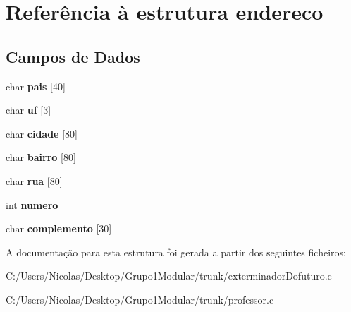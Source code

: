 \section{Referência à estrutura endereco}
\label{structendereco}
\subsection*{Campos de Dados}
\begin{DoxyCompactItemize}
\item 
\mbox{\label{structendereco_ae40bbd4eca215a884d4ffc4009723d24}} 
char {\bfseries pais} [40]
\item 
\mbox{\label{structendereco_adbe7f68c9cb7697e7baa63f3b7c6e436}} 
char {\bfseries uf} [3]
\item 
\mbox{\label{structendereco_aa92833138953f82723ced1746d65e8bc}} 
char {\bfseries cidade} [80]
\item 
\mbox{\label{structendereco_a004948d920419685c935217303957f3e}} 
char {\bfseries bairro} [80]
\item 
\mbox{\label{structendereco_afdf05fe53346e2128bfe8433594d1d39}} 
char {\bfseries rua} [80]
\item 
\mbox{\label{structendereco_a2c30f43104974e72e2809fb4569804b0}} 
int {\bfseries numero}
\item 
\mbox{\label{structendereco_a541ccb002e4c42d2dccd43bedc490741}} 
char {\bfseries complemento} [30]
\end{DoxyCompactItemize}


A documentação para esta estrutura foi gerada a partir dos seguintes ficheiros\+:\begin{DoxyCompactItemize}
\item 
C\+:/\+Users/\+Nicolas/\+Desktop/\+Grupo1\+Modular/trunk/exterminador\+Dofuturo.\+c\item 
C\+:/\+Users/\+Nicolas/\+Desktop/\+Grupo1\+Modular/trunk/professor.\+c\end{DoxyCompactItemize}
